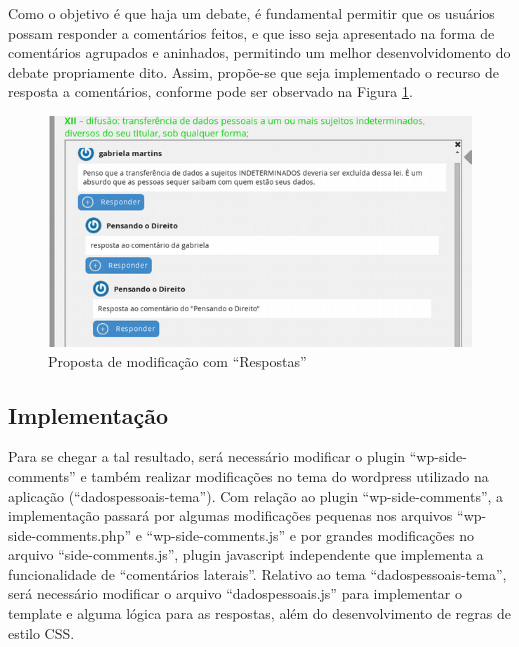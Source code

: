 Como o objetivo é que haja um debate, é fundamental permitir que os usuários possam responder a comentários feitos, e que isso seja apresentado na forma de comentários agrupados e aninhados, permitindo um melhor desenvolvidomento do debate propriamente dito. Assim, propõe-se que seja implementado o recurso de resposta a comentários, conforme pode ser observado na Figura \ref{fig:comentarios-dados-pessoais-proposta}.
    \begin{figure}[htb]%
        \begin{center}
            \includegraphics[scale=0.6]{./imagens/dados-pessoais-comment-novo.png}%
        \end{center}%
        \caption{Proposta de modificação com ``Respostas'' \label{fig:comentarios-dados-pessoais-proposta}}%
    \end{figure}%
    
\subsection{Implementação}
Para se chegar a tal resultado, será necessário modificar o plugin “wp-side-comments” e também realizar modificações no tema do wordpress utilizado na aplicação (“dadospessoais-tema”).
	Com relação ao plugin ``wp-side-comments'', a implementação passará por algumas modificações pequenas nos arquivos ``wp-side-comments.php'' e ``wp-side-comments.js'' e por grandes modificações no arquivo ``side-comments.js'', plugin javascript independente que implementa a funcionalidade de ``comentários laterais''.
	Relativo ao tema “dadospessoais-tema”, será necessário modificar o arquivo ``dadospessoais.js'' para implementar o template e alguma lógica para as respostas, além do desenvolvimento de regras de estilo CSS.
	

